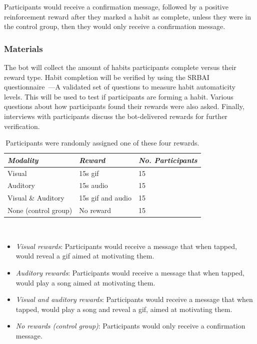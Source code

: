 Participants would receive a confirmation message, followed by a positive reinforcement reward after they marked a habit as complete, unless they were in the control group, then they would only receive a confirmation message.


\subsubsection{Materials}
The bot will collect the amount of habits participants complete versus their reward type. Habit completion will be verified by using the SRBAI questionnaire~\cite{article_4q_SRBAI}---A validated set of questions to measure habit automaticity levels. This will be used to test if participants are forming a habit. Various questions about how participants found their rewards were also asked. Finally, interviews with participants discuss the bot-delivered rewards for further verification.

\begin{table}
  \centering
  \begin{tabular}{l l l}
    {\small\textit{Modality}} & {\small \textit{Reward}} & {\small \textit{No. Participants}}\\
    \midrule
    Visual & 15s gif & 15 \\
    Auditory & 15s audio & 15 \\
    Visual \& Auditory & 15s gif and audio & 15 \\
    None (control group) & No reward & 15 \\
  \end{tabular}
  \caption{Participants were randomly assigned one of these four rewards.}~\label{fig:precise_rewards}
\end{table}


\begin{itemize}
\item \textit{Visual rewards}: Participants would receive a message that when tapped, would reveal a gif aimed at motivating them.
\item \textit{Auditory rewards}: Participants would receive a message that when tapped, would play a song aimed at motivating them.
\item \textit{Visual and auditory rewards}: Participants would receive a message that when tapped, would play a song and reveal a gif, aimed at motivating them.
\item \textit{No rewards (control group)}: Participants would only receive a confirmation message.
\end{itemize}

